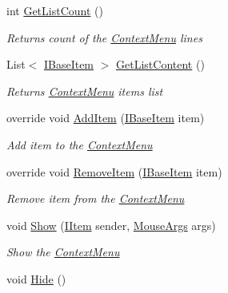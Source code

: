\begin{DoxyCompactItemize}
int \mbox{\hyperlink{class_space_v_i_l_1_1_context_menu_af0c5909f660fd0db8b458849f0a3d182}{Get\+List\+Count}} ()
\begin{DoxyCompactList}\small\item\em Returns count of the \mbox{\hyperlink{class_space_v_i_l_1_1_context_menu}{Context\+Menu}} lines \end{DoxyCompactList}\item 
List$<$ \mbox{\hyperlink{interface_space_v_i_l_1_1_core_1_1_i_base_item}{I\+Base\+Item}} $>$ \mbox{\hyperlink{class_space_v_i_l_1_1_context_menu_a9cc6b338e39d87a707c2a873f089de0d}{Get\+List\+Content}} ()
\begin{DoxyCompactList}\small\item\em Returns \mbox{\hyperlink{class_space_v_i_l_1_1_context_menu}{Context\+Menu}} items list \end{DoxyCompactList}\item 
override void \mbox{\hyperlink{class_space_v_i_l_1_1_context_menu_a17241424bae3270513087c3adaef5b2e}{Add\+Item}} (\mbox{\hyperlink{interface_space_v_i_l_1_1_core_1_1_i_base_item}{I\+Base\+Item}} item)
\begin{DoxyCompactList}\small\item\em Add item to the \mbox{\hyperlink{class_space_v_i_l_1_1_context_menu}{Context\+Menu}} \end{DoxyCompactList}\item 
override void \mbox{\hyperlink{class_space_v_i_l_1_1_context_menu_a35bae3cc791ba6de129af36ddb0fb63b}{Remove\+Item}} (\mbox{\hyperlink{interface_space_v_i_l_1_1_core_1_1_i_base_item}{I\+Base\+Item}} item)
\begin{DoxyCompactList}\small\item\em Remove item from the \mbox{\hyperlink{class_space_v_i_l_1_1_context_menu}{Context\+Menu}} \end{DoxyCompactList}\item 
void \mbox{\hyperlink{class_space_v_i_l_1_1_context_menu_a732b019d164e73d1fb165a2e1c065a50}{Show}} (\mbox{\hyperlink{interface_space_v_i_l_1_1_core_1_1_i_item}{I\+Item}} sender, \mbox{\hyperlink{class_space_v_i_l_1_1_core_1_1_mouse_args}{Mouse\+Args}} args)
\begin{DoxyCompactList}\small\item\em Show the \mbox{\hyperlink{class_space_v_i_l_1_1_context_menu}{Context\+Menu}} \end{DoxyCompactList}\item 
void \mbox{\hyperlink{class_space_v_i_l_1_1_context_menu_afad2d14b827ab4b008f2beeaefd2aca7}{Hide}} ()

\end{DoxyCompactItemize}
